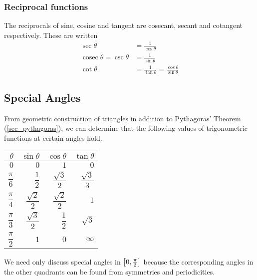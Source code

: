\documentclass[fleqn,a4paper,11pt]{article}
\begin{document}
    \subsubsection{Reciprocal functions} \label{sec_trig_reciprocal}


    The reciprocals of sine, cosine and tangent are cosecant, secant and
    cotangent respectively. These are written
    \begin{align}
    \sec \theta &= \frac{1}{\cos \theta} \\
    \operatorname{cosec} \theta = \csc \theta
        &= \frac{1}{\sin \theta} \\
    \cot \theta &= \frac{1}{\tan \theta}
        = \frac{\cos \theta}{\sin \theta}
    \end{align}

    \subsection{Special Angles}


    From geometric construction of triangles in addition to Pythagoras' Theorem
    (\ref{sec_pythagoras}), we can determine that the following values of
    trigonometric functions at certain angles hold.


    \begin{longtable}{rrrr}
    \toprule
    \(\theta\) & \(\sin \theta\) & \(\cos \theta\) &
                   \(\tan \theta\) \\
    \midrule
    \endhead
    \(0\) & \(0\) & \(1\) & \(0\) \\
    \(\dfrac \pi 6\) & \(\dfrac 12\) & \(\dfrac{\sqrt 3} 2\) &
        \(\dfrac {\sqrt 3} 3\) \\
    \(\dfrac \pi 4\) & \(\dfrac {\sqrt 2} 2\) & \(\dfrac {\sqrt 2} 2\) &
        \(1\) \\
    \(\dfrac \pi 3\) & \(\dfrac{\sqrt 3} 2\) & \(\dfrac 12\) &
        \(\sqrt 3\) \\
    \(\dfrac \pi 2\) & \(1\) & \(0\) & \(\infty\)\\
    \bottomrule
    \end{longtable}

    We need only discuss special angles in \(\intcc{0, \frac \pi 2}\) because
    the corresponding angles in the other quadrants can be found from symmetries
    and periodicities.
\end{document}
